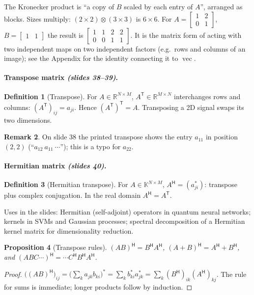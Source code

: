 \documentclass[11pt,a4paper]{article}
\newcommand{\R}{\mathbb{R}}
\newcommand{\K}{\mathbb{K}}
\newcommand{\T}{^{\mathsf{T}}}
\newcommand{\Her}{^{\mathsf{H}}}
\newcommand{\vecop}{\operatorname{vec}}
\newcommand{\slides}[1]{\texorpdfstring{\emph{(slides #1)}}{(slides #1)}}
\theoremstyle{definition}
\newtheorem{definition}{Definition}[section]
\newtheorem{remark}[definition]{Remark}
\theoremstyle{plain}
\newtheorem{proposition}[definition]{Proposition}
\begin{document}
\begin{intuition}
The Kronecker product is ``a copy of $B$ scaled by each entry of $A$'', arranged as blocks. Sizes multiply: $(2\times2)\otimes(3\times3)$ is $6\times6$. For $A=\begin{bmatrix}1&2\\0&1\end{bmatrix}$, $B=\begin{bmatrix}1&1\end{bmatrix}$ the result is $\begin{bmatrix}1&1&2&2\\0&0&1&1\end{bmatrix}$. It is the matrix form of acting with two independent maps on two independent factors (e.g.\ rows and columns of an image); see the Appendix for the identity connecting it to $\vecop$.
\end{intuition}

\paragraph{Transpose matrix \slides{38--39}.}
\begin{definition}[Transpose]
For $A\in\R^{N\times M}$, $A\T\in\R^{M\times N}$ interchanges rows and columns: $(A\T)_{ij}=a_{ji}$. Hence $(A\T)\T=A$. Transposing a 2D signal swaps its two dimensions.
\end{definition}

\begin{remark}
On slide 38 the printed transpose shows the entry $a_{11}$ in position $(2,2)$ (``$a_{12}\ a_{11}\ \cdots$''); this is a typo for $a_{22}$.
\end{remark}

\paragraph{Hermitian matrix \slides{40}.}
\begin{definition}[Hermitian transpose]
For $A\in\K^{N\times M}$, $A\Her=(a_{ji}^*)$: transpose plus complex conjugation. In the real domain $A\Her=A\T$.
\end{definition}
Uses in the slides: Hermitian (self-adjoint) operators in quantum neural networks; kernels in SVMs and Gaussian processes; spectral decomposition of a Hermitian kernel matrix for dimensionality reduction.

\begin{proposition}[Transpose rules]\label{prop:transp}
$(AB)\Her=B\Her A\Her$, $(A+B)\Her=A\Her+B\Her$, and $(ABC\cdots)\Her=\cdots C\Her B\Her A\Her$.
\end{proposition}
\begin{proof}
$\big((AB)\Her\big)_{ij}=\big(\sum_k a_{jk}b_{ki}\big)^*=\sum_k b_{ki}^*a_{jk}^*=\sum_k (B\Her)_{ik}(A\Her)_{kj}$. The rule for sums is immediate; longer products follow by induction.
\end{proof}
\end{document}
